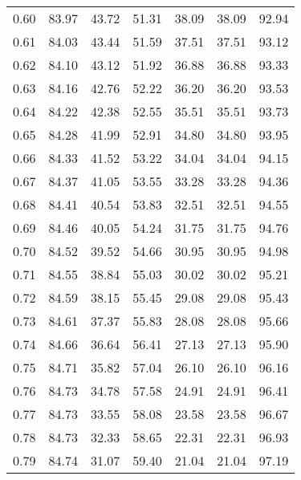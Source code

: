 \begin{tabular}{|c|c|c|c|c|c|c|}
      0.60 &     83.97 &     43.72 &      51.31 &   38.09 &      38.09 &         92.94 \\
      0.61 &     84.03 &     43.44 &      51.59 &   37.51 &      37.51 &         93.12 \\
      0.62 &     84.10 &     43.12 &      51.92 &   36.88 &      36.88 &         93.33 \\
      0.63 &     84.16 &     42.76 &      52.22 &   36.20 &      36.20 &         93.53 \\
      0.64 &     84.22 &     42.38 &      52.55 &   35.51 &      35.51 &         93.73 \\
      0.65 &     84.28 &     41.99 &      52.91 &   34.80 &      34.80 &         93.95 \\
      0.66 &     84.33 &     41.52 &      53.22 &   34.04 &      34.04 &         94.15 \\
      0.67 &     84.37 &     41.05 &      53.55 &   33.28 &      33.28 &         94.36 \\
      0.68 &     84.41 &     40.54 &      53.83 &   32.51 &      32.51 &         94.55 \\
      0.69 &     84.46 &     40.05 &      54.24 &   31.75 &      31.75 &         94.76 \\
      0.70 &     84.52 &     39.52 &      54.66 &   30.95 &      30.95 &         94.98 \\
      0.71 &     84.55 &     38.84 &      55.03 &   30.02 &      30.02 &         95.21 \\
      0.72 &     84.59 &     38.15 &      55.45 &   29.08 &      29.08 &         95.43 \\
      0.73 &     84.61 &     37.37 &      55.83 &   28.08 &      28.08 &         95.66 \\
      0.74 &     84.66 &     36.64 &      56.41 &   27.13 &      27.13 &         95.90 \\
      0.75 &     84.71 &     35.82 &      57.04 &   26.10 &      26.10 &         96.16 \\
      0.76 &     84.73 &     34.78 &      57.58 &   24.91 &      24.91 &         96.41 \\
      0.77 &     84.73 &     33.55 &      58.08 &   23.58 &      23.58 &         96.67 \\
      0.78 &     84.73 &     32.33 &      58.65 &   22.31 &      22.31 &         96.93 \\
      0.79 &     84.74 &     31.07 &      59.40 &   21.04 &      21.04 &         97.19 \\

\end{tabular}
